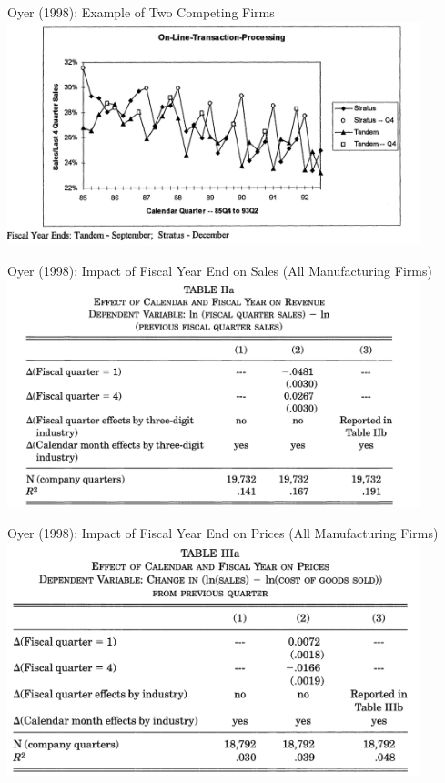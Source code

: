 \documentclass[aspectratio=169,usenames,dvipsnames]{beamer}
\begin{document}
\begin{frame}[c]{Oyer (1998): Example of Two Competing Firms}
\centering
\includegraphics[width=0.9\textwidth]{pictures/oyer_suggestive.png}

\end{frame} 

\begin{frame}[c]{Oyer (1998): Impact of Fiscal Year End on Sales (All Manufacturing Firms) }
\centering
\includegraphics[width=0.9\textwidth]{pictures/oyer_main.png}

\end{frame}

\begin{frame}[c]{Oyer (1998): Impact of Fiscal Year End on Prices (All Manufacturing Firms) }
\centering
\includegraphics[width=0.9\textwidth]{pictures/oyer_price.png}

\end{frame}
\end{document}
